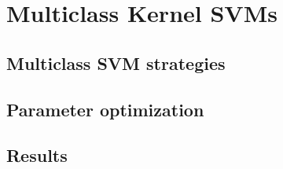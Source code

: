 
\section{Multiclass Kernel SVMs}

\subsection{Multiclass SVM strategies}

\subsection{Parameter optimization}

\subsection{Results}